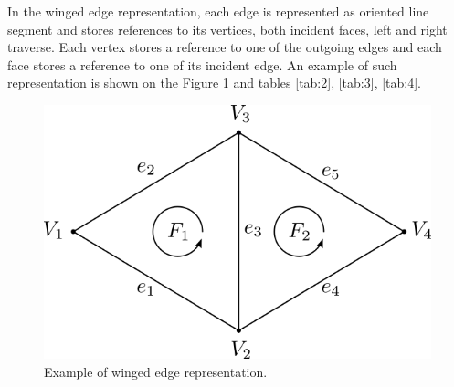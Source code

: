 In the winged edge representation, each edge is represented as oriented line segment 
and stores references to its vertices, both incident faces, left and right traverse. 
Each vertex stores a reference to one of the outgoing edges and each
face stores a reference to one of its incident edge. An example of such representation
is shown on the Figure \ref{img:30} and tables \ref{tab:2}, \ref{tab:3}, \ref{tab:4}.

\begin{figure}
    \centerline{\includegraphics[scale=0.5]{images/img30}}
    \caption[Example of winged edge representation]
    {Example of winged edge representation.}
    \label{img:30}
\end{figure}

